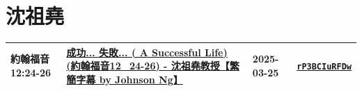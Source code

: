 \documentclass{book}
\begin{document}
\chapter{沈祖堯}\label{ch:preacher8}
\begin{multicols}{3}
\minitoc
\end{multicols}
{ \scriptsize


\begin{xltabular}{\textwidth}{|p{0.15\textwidth} p{0.6\textwidth}|p{0.07\textwidth} p{0.1\textwidth}|}
\hline
約翰福音 12:24-26 & \hyperref[sec:rP3BCIuRFDw]{成功... 失敗... ( A Successful Life) (約翰福音12\_24-26) - 沈祖堯教授【繁簡字幕 by Johnson Ng】} & 2025-03-25 & \href{https://youtube.com/watch?v=rP3BCIuRFDw}{\texttt{rP3BCIuRFDw}} \\
\hline
\end{xltabular}
}
\newpage
\end{document}
